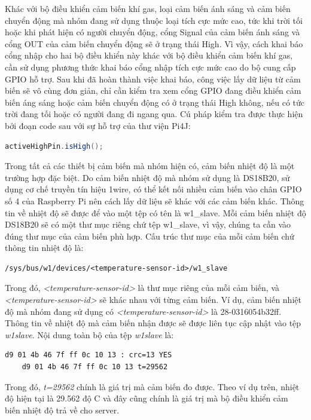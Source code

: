 \documentclass[12pt,a4paper,oneside]{extbook}
\begin{document}
Khác với bộ điều khiển cảm biến khí gas, loại cảm biến ánh sáng và cảm biến chuyển động mà nhóm đang sử dụng thuộc loại tích cực mức cao, tức khi trời tối hoặc khi phát hiện có người chuyển động, cổng Signal của cảm biến ánh sáng và cổng OUT của cảm biến chuyển động sẽ ở trạng thái High. Vì vậy, cách khai báo cổng nhập cho hai bộ điều khiển này khác với bộ điều khiển cảm biến khí gas, cần sử dụng phương thức khai báo cổng nhập tích cực mức cao do bộ cung cấp GPIO hỗ trợ. Sau khi đã hoàn thành việc khai báo, công việc lấy dữ liệu từ cảm biến sẽ vô cùng đơn giản, chỉ cần kiểm tra xem cổng GPIO đang điều khiển cảm biến áng sáng hoặc cảm biến chuyển động có ở trạng thái High không, nếu có tức trời đang tối hoặc có người đang đi ngang qua. Cú pháp kiểm tra được thực hiện bởi đoạn code sau với sự hỗ trợ của thư viện Pi4J:

\begin{lstlisting}[language=Java, label={lst:check-state-active-high}]
	activeHighPin.isHigh();
\end{lstlisting}

Trong tất cả các thiết bị cảm biến mà nhóm hiện có, cảm biến nhiệt độ là một trường hợp đặc biệt. Do cảm biến nhiệt độ mà nhóm sử dụng là DS18B20, sử dụng cơ chế truyền tín hiệu 1\-wire, có thể kết nối nhiều cảm biến vào chân GPIO số 4 của Raspberry Pi nên cách lấy dữ liệu sẽ khác với các cảm biến khác. Thông tin về nhiệt độ sẽ được để vào một tệp có tên là w1\_slave. Mỗi cảm biến nhiệt độ DS18B20 sẽ có một thư mục riêng chứ tệp w1\_slave, vì vậy, chúng ta cần vào đúng thư mục của cảm biến phù hợp. Cấu trúc thư mục của mỗi cảm biến chứ thông tin nhiệt độ là:
\begin{verbatim}
/sys/bus/w1/devices/<temperature-sensor-id>/w1_slave
\end{verbatim}
Trong đó, \textit{<temperature-sensor-id>} là thư mục riêng của mỗi cảm biến, và \textit{<temperature-sensor-id>} sẽ khác nhau với từng cảm biến. Ví dụ, cảm biến nhiệt độ mà nhóm đang sử dụng có \textit{<temperature-sensor-id>} là 28-0316054b32ff. Thông tin về nhiệt độ mà cảm biến nhận được sẽ được liên tục cập nhật vào tệp \textit{w1\textunderscore slave}. Nội dung toàn bộ của tệp \textit{w1\textunderscore slave} là:

\begin{lstlisting}[label={lst:temperature-file}]
	d9 01 4b 46 7f ff 0c 10 13 : crc=13 YES
	d9 01 4b 46 7f ff 0c 10 13 t=29562
\end{lstlisting}

Trong đó, \textit{t=29562} chính là giá trị mà cảm biến đo được. Theo ví dụ trên, nhiệt độ hiện tại là 29.562 độ C và đây cũng chính là giá trị mà bộ điều khiển cảm biến nhiệt độ trả về cho server.
\end{document}

